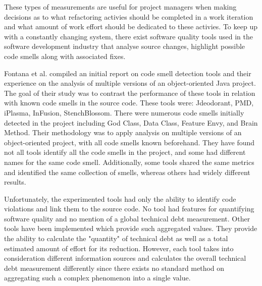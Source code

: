 \documentclass{mprop}
\begin{document}

These types of measurements are useful for project managers when making
decisions as to what refactoring activies should be completed in a work
iteration and what amount of work effort should be dedicated to these activies.
To keep up with a constantly changing system, there exist software quality tools
used in the software development industry that analyse source changes, highlight
possible code smells along with associated fixes.

Fontana et al. \cite{Fontana2011} compiled an initial report on code smell
detection tools and their experience on the analysis of multiple versions of an
object-oriented Java project. The goal of their study was to contrast the
performance of these tools in relation with known code smells in the source
code. These tools were: Jdeodorant, PMD, iPlasma, InFusion, StenchBlossom. There
were numerous code smells initially detected in the project including God Class,
Data Class, Feature Envy, and Brain Method. Their methodology was to apply
analysis on multiple versions of an object-oriented project, with all code
smells known beforehand. They have found not all tools identify all the code
smells in the project, and some had different names for the same code smell.
Additionally, some tools shared the same metrics and identified the same
collection of smells, whereas others had widely different results.

Unfortunately, the experimented tools had only the ability to identify code
violations and link them to the source code. No tool had features for
quantifying software quality and no mention of a global technical debt
measurement. Other tools have been implemented which provide such aggregated
values. They provide the ability to calculate the "quantity" of technical debt
as well as a total estimated amount of effort for its reduction. However, each
tool takes into consideration different information sources and calculates the
overall technical debt measurement differently since there exists no standard
method on aggregating such a complex phenomenon into a single value.
\end{document}
